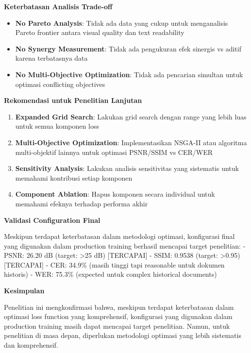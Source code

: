 \documentclass[12pt,a4paper]{article}
\begin{document}
\textbf{Keterbatasan Analisis Trade-off}

\begin{itemize}[leftmargin=*]
    \item \textbf{No Pareto Analysis}: Tidak ada data yang cukup untuk menganalisis Pareto frontier antara visual quality dan text readability
    \item \textbf{No Synergy Measurement}: Tidak ada pengukuran efek sinergis vs aditif karena terbatasnya data
    \item \textbf{No Multi-Objective Optimization}: Tidak ada pencarian simultan untuk optimasi conflicting objectives
\end{itemize}

\textbf{Rekomendasi untuk Penelitian Lanjutan}

\begin{enumerate}[leftmargin=*]
    \item \textbf{Expanded Grid Search}: Lakukan grid search dengan range yang lebih luas untuk semua komponen loss
    \item \textbf{Multi-Objective Optimization}: Implementasikan NSGA-II atau algoritma multi-objektif lainnya untuk optimasi PSNR/SSIM vs CER/WER
    \item \textbf{Sensitivity Analysis}: Lakukan analisis sensitivitas yang sistematis untuk memahami kontribusi setiap komponen
    \item \textbf{Component Ablation}: Hapus komponen secara individual untuk memahami efeknya terhadap performa akhir
\end{enumerate}

\textbf{Validasi Configuration Final}

Meskipun terdapat keterbatasan dalam metodologi optimasi, konfigurasi final yang digunakan dalam production training berhasil mencapai target penelitian:
- PSNR: 26.20 dB (target: >25 dB) [TERCAPAI]
- SSIM: 0.9538 (target: >0.95) [TERCAPAI]  
- CER: 34.9\% (masih tinggi tapi reasonable untuk dokumen historis)
- WER: 75.3\% (expected untuk complex historical documents)

\textbf{Kesimpulan}

Penelitian ini mengkonfirmasi bahwa, meskipun terdapat keterbatasan dalam optimasi loss function yang komprehensif, konfigurasi yang digunakan dalam production training masih dapat mencapai target penelitian. Namun, untuk penelitian di masa depan, diperlukan metodologi optimasi yang lebih sistematis dan komprehensif.

\vspace{0.8em}
\end{document}
